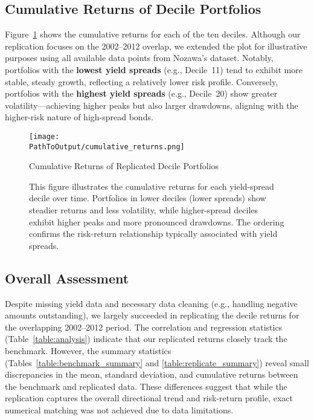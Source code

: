 \documentclass[12pt]{article}
\begin{document}
\subsection{Cumulative Returns of Decile Portfolios}
Figure~\ref{fig:cumulative_returns} shows the cumulative returns for each of the ten deciles. Although our replication focuses on the 2002--2012 overlap, we extended the plot for illustrative purposes using all available data points from Nozawa’s dataset. Notably, portfolios with the \textbf{lowest yield spreads} (e.g., Decile~11) tend to exhibit more stable, steady growth, reflecting a relatively lower risk profile. Conversely, portfolios with the \textbf{highest yield spreads} (e.g., Decile~20) show greater volatility—achieving higher peaks but also larger drawdowns, aligning with the higher-risk nature of high-spread bonds.

\begin{figure}[H]
\centering
\texttt{[image: \\PathToOutput/cumulative\_returns.png]}
\caption{Cumulative Returns of Replicated Decile Portfolios}
\caption*{\footnotesize This figure illustrates the cumulative returns for each yield-spread decile over time. Portfolios in lower deciles (lower spreads) show steadier returns and less volatility, while higher-spread deciles exhibit higher peaks and more pronounced drawdowns. The ordering confirms the risk-return relationship typically associated with yield spreads.}
\label{fig:cumulative_returns}
\end{figure}

\subsection{Overall Assessment}
Despite missing yield data and necessary data cleaning (e.g., handling negative amounts outstanding), we largely succeeded in replicating the decile returns for the overlapping 2002--2012 period. The correlation and regression statistics (Table~\ref{table:analysis}) indicate that our replicated returns closely track the benchmark. However, the summary statistics (Tables~\ref{table:benchmark_summary} and \ref{table:replicate_summary}) reveal small discrepancies in the mean, standard deviation, and cumulative returns between the benchmark and replicated data. These differences suggest that while the replication captures the overall directional trend and risk-return profile, exact numerical matching was not achieved due to data limitations.
\end{document}
